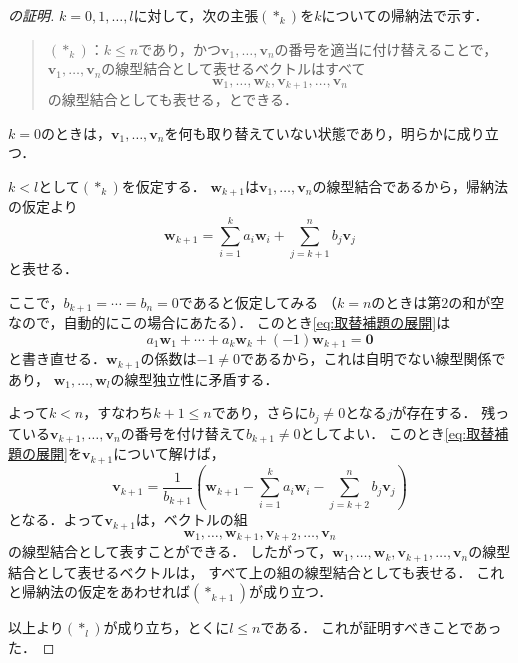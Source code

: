 \begin{tleftbar}
\begin{proof}[の証明]
  $k = 0, 1, \dots, l$に対して，次の主張$(\ast_k)$を$k$についての帰納法で示す．

  \begin{quote}
    $(\ast_k)$：$k \le n$であり，かつ$\bm{v}_1, \dots, \bm{v}_n$の番号を適当に付け替えることで，
    $\bm{v}_1, \dots, \bm{v}_n$の線型結合として表せるベクトルはすべて
    \[
      \bm{w}_1, \dots, \bm{w}_k, \bm{v}_{k+1}, \dots, \bm{v}_n
    \]
    の線型結合としても表せる，とできる．
  \end{quote}

  $k = 0$のときは，$\bm{v}_1, \dots, \bm{v}_n$を何も取り替えていない状態であり，明らかに成り立つ．

  $k < l$として$(\ast_k)$を仮定する．
  $\bm{w}_{k+1}$は$\bm{v}_1, \dots, \bm{v}_n$の線型結合であるから，帰納法の仮定より
  \begin{equation}
    \bm{w}_{k+1}
    = \sum_{i=1}^{k} a_i \bm{w}_i + \sum_{j=k+1}^{n} b_j \bm{v}_j
    \label{eq:取替補題の展開}
  \end{equation}
  と表せる．

  ここで，$b_{k+1} = \cdots = b_n = 0$であると仮定してみる
  （$k = n$のときは第$2$の和が空なので，自動的にこの場合にあたる）．
  このとき\eqref{eq:取替補題の展開}は
  \[
    a_1 \bm{w}_1 + \cdots + a_k \bm{w}_k + (-1)\bm{w}_{k+1} = \bm{0}
  \]
  と書き直せる．$\bm{w}_{k+1}$の係数は$-1 \ne 0$であるから，これは自明でない線型関係であり，
  $\bm{w}_1, \dots, \bm{w}_l$の線型独立性に矛盾する．

  よって$k < n$，すなわち$k + 1 \le n$であり，さらに$b_j \ne 0$となる$j$が存在する．
  残っている$\bm{v}_{k+1}, \dots, \bm{v}_n$の番号を付け替えて$b_{k+1} \ne 0$としてよい．
  このとき\eqref{eq:取替補題の展開}を$\bm{v}_{k+1}$について解けば，
  \[
    \bm{v}_{k+1}
    = \frac{1}{b_{k+1}}\left( \bm{w}_{k+1} - \sum_{i=1}^{k} a_i \bm{w}_i - \sum_{j=k+2}^{n} b_j \bm{v}_j \right)
  \]
  となる．よって$\bm{v}_{k+1}$は，ベクトルの組
  \[
    \bm{w}_1, \dots, \bm{w}_{k+1}, \bm{v}_{k+2}, \dots, \bm{v}_n
  \]
  の線型結合として表すことができる．
  したがって，$\bm{w}_1, \dots, \bm{w}_k, \bm{v}_{k+1}, \dots, \bm{v}_n$の線型結合として表せるベクトルは，
  すべて上の組の線型結合としても表せる．
  これと帰納法の仮定をあわせれば$(\ast_{k+1})$が成り立つ．

  以上より$(\ast_l)$が成り立ち，とくに$l \le n$である．
  これが証明すべきことであった．
\end{proof}
\end{tleftbar}

